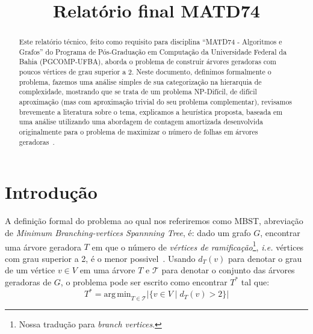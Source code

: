 \documentclass[conference]{IEEEtran}
\begin{document}
\title{Relatório final MATD74}

\author{
}

\maketitle

\begin{abstract}
  Este relatório t\'ecnico, feito como requisito para disciplina ``MATD74 - Algoritmos e Grafos'' do Programa de Pós-Graduação em Computação da Universidade Federal da Bahia (PGCOMP-UFBA), aborda o problema de construir árvores geradoras com poucos vértices de grau superior a 2.
  Neste documento, definimos formalmente o problema, fazemos uma análise simples de sua categorização na hierarquia de complexidade, mostrando que se trata de um problema NP-Difícil, de difícil aproximação (mas com aproximação trivial do seu problema complementar), revisamos brevemente a literatura sobre o tema, explicamos a heur\'istica proposta, baseada em uma an\'alise utilizando uma abordagem
  de contagem amortizada desenvolvida originalmente para o problema de maximizar o n\'umero de folhas
  em \'arvores geradoras~\cite{solis-oba2017}.
\end{abstract}

\section{Introdução}
A definição formal do problema ao qual nos referiremos como MBST, abreviação de \textit{Minimum Branching-vertices Spannning Tree}, é: dado um grafo $G$, encontrar uma árvore geradora $T$ em que o número de \emph{vértices de ramificação}\footnote{Nossa tradução para \textit{branch vertices}.}, \textit{i.e.} vértices com grau superior a 2, é o menor possivel~\cite{gargano2004}.
Usando $d_T(v)$ para denotar o grau de um vértice $v \in V$ em uma árvore $T$ e $\mathcal{T}$ para denotar o conjunto das árvores geradoras de $G$, o problema pode ser escrito como encontrar $T^*$ tal que:
\begin{equation}
  T^* = \mathrm{arg\,min}_{T \in \mathcal{T}} |\{v \in V \mid d_T(v) > 2 \}| 
\end{equation}
\end{document}
